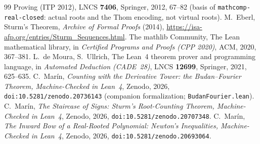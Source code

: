 \documentclass[11pt]{article}
\newcommand{\lean}[1]{\texttt{#1}}
\begin{document}
\begin{thebibliography}{99}
{Proving (ITP 2012)}, LNCS \textbf{7406}, Springer, 2012, 67--82 (basis of \lean{mathcomp-real-closed}:
actual roots and the Thom encoding, not virtual roots).
 M.~Eberl, Sturm's Theorem, \emph{Archive of Formal Proofs} (2014),
\url{https://isa-afp.org/entries/Sturm_Sequences.html}.
 The mathlib Community, The Lean mathematical library, in \emph{Certified Programs and
Proofs (CPP 2020)}, ACM, 2020, 367--381.
 L.~de Moura, S.~Ullrich, The Lean~4 theorem prover and programming language, in
\emph{Automated Deduction (CADE~28)}, LNCS \textbf{12699}, Springer, 2021, 625--635.
 C.~Mar\'in, \emph{Counting with the Derivative Tower: the Budan--Fourier Theorem,
Machine-Checked in Lean~4}, Zenodo, 2026, \texttt{doi:10.5281/zenodo.20736143} (companion
formalization; \lean{BudanFourier.lean}).
 C.~Mar\'in, \emph{The Staircase of Signs: Sturm's Root-Counting Theorem,
Machine-Checked in Lean~4}, Zenodo, 2026, \texttt{doi:10.5281/zenodo.20707348}.
 C.~Mar\'in, \emph{The Inward Bow of a Real-Rooted Polynomial: Newton's Inequalities,
Machine-Checked in Lean~4}, Zenodo, 2026, \texttt{doi:10.5281/zenodo.20693064}.
\end{thebibliography}
\end{document}
